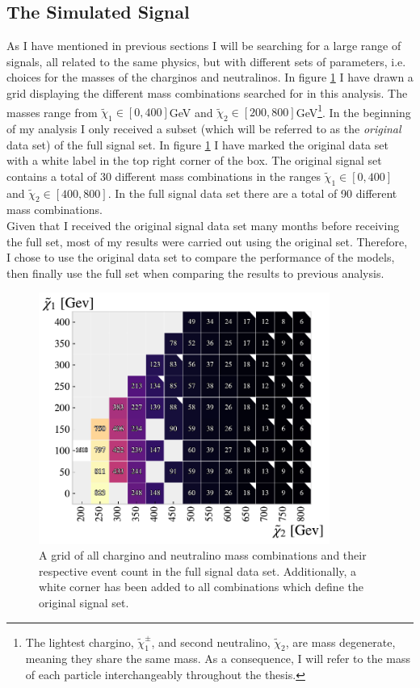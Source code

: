 \subsection{The Simulated Signal}\label{subsec:signal}
As I have mentioned in previous sections I will be searching for a large range of signals, all related to the same
physics, but with different sets of parameters, i.e. choices for the masses of the charginos and neutralinos. In figure \ref{fig:nrSignal} I have drawn a 
grid displaying the different mass combinations searched for in this analysis. The masses range from ${\tilde{\chi}_1}\in[0,400]$GeV
and ${\tilde{\chi}_2}\in[200,800]$GeV\footnote{The lightest chargino, $\tilde{\chi}^{\pm}_1$, and second neutralino, $\tilde{\chi}_2$, are mass degenerate, 
meaning they share the same mass. As a consequence, I will refer to the mass of each particle interchangeably throughout the thesis.}. In the beginning 
of my analysis I only received a subset (which will be referred to as the \emph{original} data set) of the full signal set. In figure \ref{fig:nrSignal} 
I have marked the original data set with a white label in the top right corner of the box. The original signal set contains a total of 30 different mass 
combinations in the ranges ${\tilde{\chi}_1}\in[0,400]$ and ${\tilde{\chi}_2}\in[400,800]$. In the full signal data set there are a total of 90 different 
mass combinations.
\\
Given that I received the original signal data set many months before receiving the full set, most of my results were carried out using the 
original set. Therefore, I chose to use the original data set to compare the performance of the models, then finally use the full set 
when comparing the results to previous analysis.
\begin{figure}
  \centering
  \includegraphics[width=0.85\textwidth]{Figures/MLResults/NN/SUSY/Grid/NrSignalEvents.pdf}
  \caption{A grid of all chargino and neutralino mass combinations and their respective event count in the full signal data set.
  Additionally, a white corner has been added to all combinations which define the original signal set.}
  \label{fig:nrSignal}
\end{figure}
